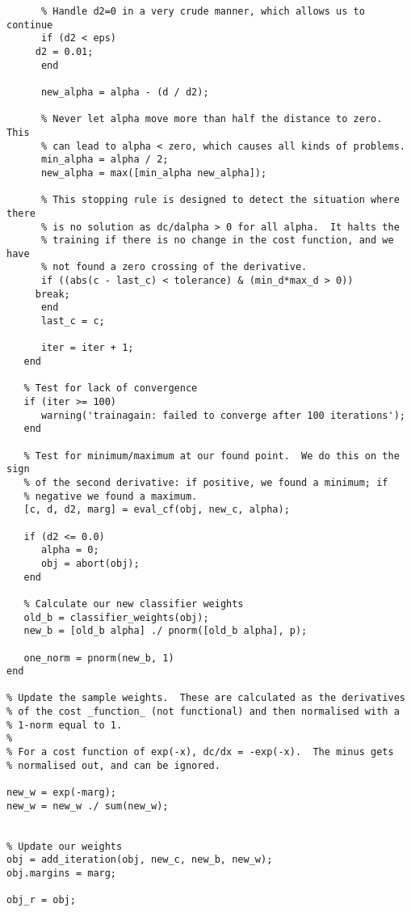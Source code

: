 \begin{verbatim}
      % Handle d2=0 in a very crude manner, which allows us to continue
      if (d2 < eps)
	 d2 = 0.01;
      end
      
      new_alpha = alpha - (d / d2);
      
      % Never let alpha move more than half the distance to zero.  This
      % can lead to alpha < zero, which causes all kinds of problems.
      min_alpha = alpha / 2;
      new_alpha = max([min_alpha new_alpha]);
      
      % This stopping rule is designed to detect the situation where there
      % is no solution as dc/dalpha > 0 for all alpha.  It halts the
      % training if there is no change in the cost function, and we have
      % not found a zero crossing of the derivative.
      if ((abs(c - last_c) < tolerance) & (min_d*max_d > 0))
	 break;
      end
      last_c = c;
      
      iter = iter + 1;
   end

   % Test for lack of convergence
   if (iter >= 100)
      warning('trainagain: failed to converge after 100 iterations');
   end
   
   % Test for minimum/maximum at our found point.  We do this on the sign
   % of the second derivative: if positive, we found a minimum; if
   % negative we found a maximum.
   [c, d, d2, marg] = eval_cf(obj, new_c, alpha);
   
   if (d2 <= 0.0)
      alpha = 0;
      obj = abort(obj);
   end
   
   % Calculate our new classifier weights   
   old_b = classifier_weights(obj);
   new_b = [old_b alpha] ./ pnorm([old_b alpha], p);

   one_norm = pnorm(new_b, 1)
end

% Update the sample weights.  These are calculated as the derivatives
% of the cost _function_ (not functional) and then normalised with a
% 1-norm equal to 1.
%
% For a cost function of exp(-x), dc/dx = -exp(-x).  The minus gets
% normalised out, and can be ignored.

new_w = exp(-marg);
new_w = new_w ./ sum(new_w);


% Update our weights
obj = add_iteration(obj, new_c, new_b, new_w);
obj.margins = marg;

obj_r = obj;
\end{verbatim}
